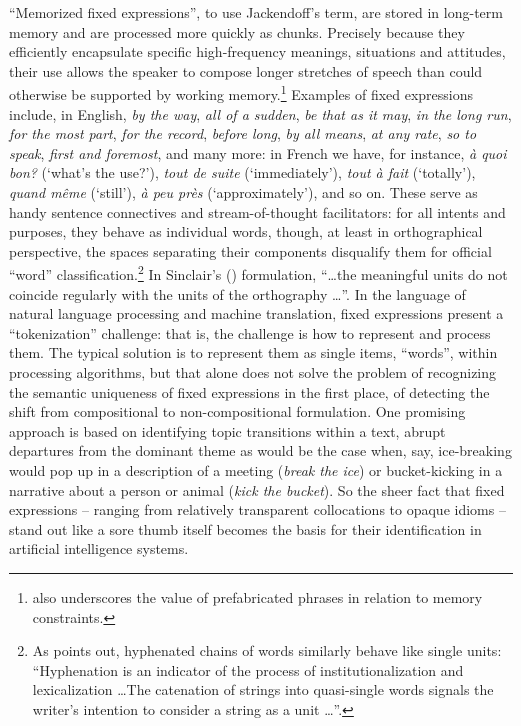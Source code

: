 \documentclass[english,output=paper,colorlinks,citecolor=brown]{../langscibook}
\begin{document}
\largerpage[-1]
``Memorized fixed expressions'', to use Jackendoff’s term, are stored in long-term memory and are processed more quickly as chunks. Precisely because they efficiently encapsulate specific high-frequency meanings, situations and attitudes, their use allows the speaker to compose longer stretches of speech than could otherwise be supported by working memory.\footnote{\citet{Bolinger1976} also underscores the value of prefabricated phrases in relation to memory constraints.} Examples of fixed expressions include, in English, \textit{by the way}, \textit{all of a sudden}, \textit{be that as it may}, \textit{in the long run}, \textit{for the most part}, \textit{for the record}, \textit{before long}, \textit{by all means}, \textit{at any rate}, \textit{so to speak}, \textit{first and foremost}, and many more: in French we have, for instance, \textit{à quoi bon?} (`what’s the use?'), \textit{tout de suite} (`immediately'), \textit{tout à fait} (`totally'), \textit{quand même} (`still'), \textit{à peu près} (`approximately'), and so on. These serve as handy sentence connectives and stream-of-thought facilitators: for all intents and purposes, they behave as individual words, though, at least in orthographical perspective, the spaces separating their components disqualify them for official ``word'' classification.\footnote{As \citet[43]{Moon1998} points out, hyphenated chains of words similarly behave like single units: ``Hyphenation is an indicator of the process of institutionalization and lexicalization …The catenation of strings into quasi-single words signals the writer’s intention to consider a string as a unit …''.} In Sinclair's (\citeyear[410]{Sinclair2008}) formulation, ``…the meaningful units do not coincide regularly with the units of the orthography …''. In the language of natural language processing and machine translation, fixed expressions present a ``tokenization'' challenge: that is, the challenge is how to represent and process them. The typical solution is to represent them as single items, ``words'', within processing algorithms, but that alone does not solve the problem of recognizing the semantic uniqueness of fixed expressions in the first place, of detecting the shift from compositional to non-compositional formulation. One promising approach is based on identifying topic transitions within a text, abrupt departures from the dominant theme as would be the case when, say, ice-breaking would pop up in a description of a meeting (\textit{break the ice}) or bucket-kicking in a narrative about a person or animal (\textit{kick the bucket}). So the sheer fact that fixed expressions – ranging from relatively transparent collocations to opaque idioms – stand out like a sore thumb itself becomes the basis for their identification in artificial intelligence systems.
\end{document}
